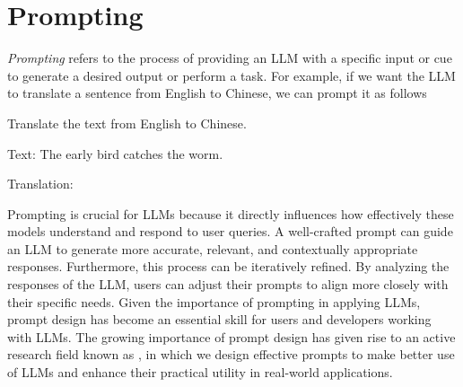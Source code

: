 
%




\chapter{Prompting}

\thispagestyle{chapterurl} %

\noindent \textit{Prompting} refers to the process of providing an LLM with a specific input or cue to generate a desired output or perform a task. For example, if we want the LLM to translate a sentence from English to Chinese, we can prompt it as follows

\vspace{0.5em}
\begin{tcolorbox}
\hspace{2em} Translate the text from English to Chinese.

\vspace{0.2cm}

\hspace{2em} Text: The early bird catches the worm.

\vspace{0.2cm}

\hspace{2em} Translation: \underline{\hspace{2em}}
\end{tcolorbox}
\vspace{0.5em}

\noindent Prompting is crucial for LLMs because it directly influences how effectively these models understand and respond to user queries. A well-crafted prompt can guide an LLM to generate more accurate, relevant, and contextually appropriate responses. Furthermore, this process can be iteratively refined. By analyzing the responses of the LLM, users can adjust their prompts to align more closely with their specific needs. Given the importance of prompting in applying LLMs, prompt design has become an essential skill for users and developers working with LLMs. The growing importance of prompt design has given rise to an active research field known as , in which we design effective prompts to make better use of LLMs and enhance their practical utility in real-world applications.

